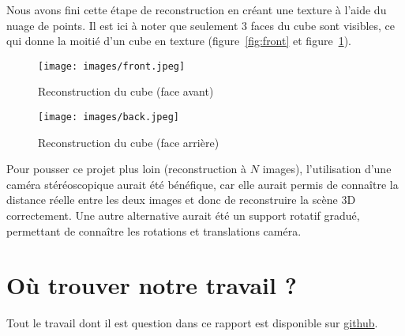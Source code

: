 \documentclass[12pt]{article}
\begin{document}
Nous avons fini cette étape de reconstruction en créant une texture à l'aide du nuage de points. Il est ici à noter que seulement 3 faces du cube sont visibles, ce qui donne la moitié d'un cube en texture (figure~\ref{fig:front} et figure~\ref{fig:back}).

\begin{figure}[H]
    \centering
    \begin{minipage}[b]{0.45\textwidth}
        \centering
        \texttt{[image: images/front.jpeg]}
        \caption{Reconstruction du cube (face avant)}
        \label{fig:front}
    \end{minipage}\hfill
    \begin{minipage}[b]{0.45\textwidth}
        \centering
        \texttt{[image: images/back.jpeg]}
        \caption{Reconstruction du cube (face arrière)}
        \label{fig:back}
    \end{minipage} 
\end{figure}

Pour pousser ce projet plus loin (reconstruction à $N$ images), l'utilisation d'une caméra stéréoscopique aurait été bénéfique, car elle aurait permis de connaître la distance réelle entre les deux images et donc de reconstruire la scène 3D correctement.
Une autre alternative aurait été un support rotatif gradué, permettant de connaître les rotations et translations caméra.

\section{Où trouver notre travail ?}

Tout le travail dont il est question dans ce rapport est disponible sur \href{https://github.com/antoinedenovembre/3d_reconstruction}{github}.

\newpage
\renewcommand{\refname}{Bibliographie}



\end{document}
